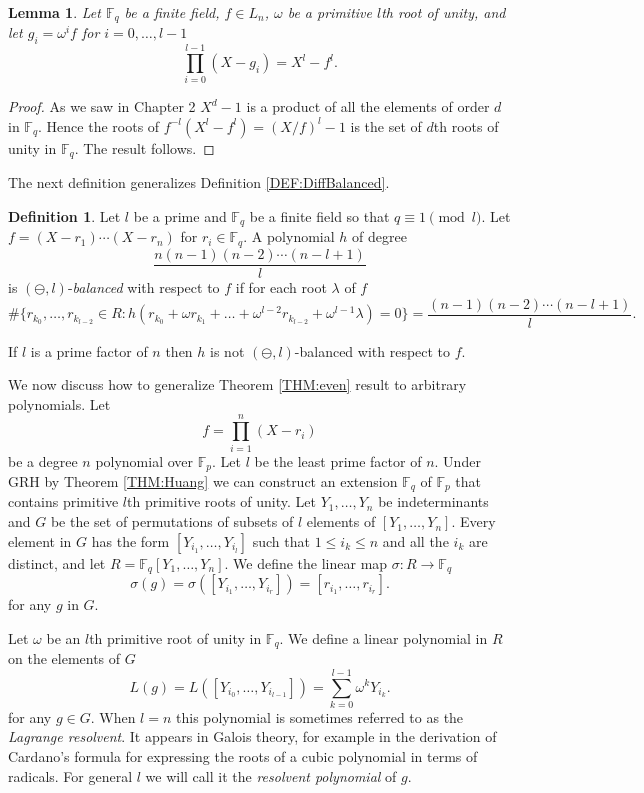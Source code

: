 \documentclass{article}
\newcounter{dummy} \numberwithin{dummy}{section}
\theoremstyle{plain}
\newtheorem{lem}[dummy]{Lemma}
\theoremstyle{definition}
\newtheorem{mydef}[dummy]{Definition}
\def\Fp {{ \mathbb{F} _ {p} }}
\def\Fq {{ \mathbb{F} _ {q} }}
\begin{document}
		\begin{lem}
		\label{LEM:cycle}
		    Let $\Fq$ be a finite field, $f \in L_n$, $\omega$ be a primitive $l$th root of unity, and let $g_i=\omega^i f$ for $i=0,\ldots,l-1$
		    \[
		        \prod_{i=0}^{l-1}{(X-g_i)}=X^l-f^l.
		    \]
	  \end{lem}
		
		\begin{proof}
		    As we saw in Chapter 2 $X^d-1$ is a product of all the elements of order $d$ in $\Fq$. Hence the roots of $f^{-l}(X^l-f^l)=(X/f)^l-1$ is the set of $d$th roots of unity in $\Fq$. The result follows. 
		\end{proof}
		
		The next definition generalizes Definition \ref{DEF:DiffBalanced}.
		
		\begin{mydef}
		\label{DEF:RonyaiBalanced}
		    Let $l$ be a prime and $\Fq$ be a finite field so that $q \equiv 1 \pmod l$. Let $f=(X-r_1)\cdots(X-r_n)$ for $r_i \in \Fq$. A polynomial $h$ of degree 
				\[ \frac{n(n-1)(n-2)\cdots(n-l+1)}{l} \]
				is $(\ominus,l)$-\emph{balanced} with respect to $f$ if for each root $\lambda$ of $f$  
			  \[ {\#} \{ r_{k_0},\ldots,r_{k_{l-2}} \in R : h(r_{k_0}+\omega r_{k_1} + \ldots + \omega^{l-2} r_{k_{l-2}} + \omega^{l-1}{\lambda}  )=0 \} = \frac{(n-1)(n-2)\cdots(n-l+1)}{l}. \]
		\end{mydef}
		
		If $l$ is a prime factor of $n$ then $h$ is not $(\ominus,l)$-balanced with respect to $f$. 
		
		We now discuss how to generalize Theorem \ref{THM:even} result to arbitrary polynomials. Let 
		\[ f=\prod_{i=1}^n{(X-r_i)} \]
		be a degree $n$ polynomial over $\Fp$. Let $l$ be the least prime factor of $n$. Under GRH by Theorem \ref{THM:Huang} we can construct an extension $\Fq$ of $\Fp$ that contains primitive $l$th primitive roots of unity. Let $Y_1,\ldots,Y_n$ be indeterminants and $G$ be the set of permutations of subsets of $l$ elements of $[Y_1,\ldots,Y_n]$. Every element in $G$ has the form $[Y_{i_1},\ldots,Y_{i_l}]$ such that $1 \leq i_k \leq n$ and all the $i_k$ are distinct, and let $R=\Fq[Y_1,\ldots,Y_n]$. We define the linear map $\sigma : R \rightarrow \Fq$
		\[
		    \sigma(g)
				=\sigma([Y_{i_1},\ldots,Y_{i_r}])
				=[r_{i_1} , \ldots, r_{i_r} ].
		\]
		\noindent for any $g$ in $G$.
		
		Let $\omega$ be an $l$th primitive root of unity in $\Fq$. We define a linear polynomial in $R$ on the elements of $G$
		\[
		    L(g)=L([Y_{i_0},\ldots,Y_{i_{l-1}}])=\sum_{k=0}^{l-1}{\omega^kY_{i_k}}.
		\]
		for any $g \in G$. When $l=n$ this polynomial is sometimes referred to as the \emph{Lagrange resolvent}. It appears in Galois theory, for example in the derivation of Cardano's formula for expressing the roots of a cubic polynomial in terms of radicals. For general $l$ we will call it the \emph{resolvent polynomial} of $g$.
\end{document}
